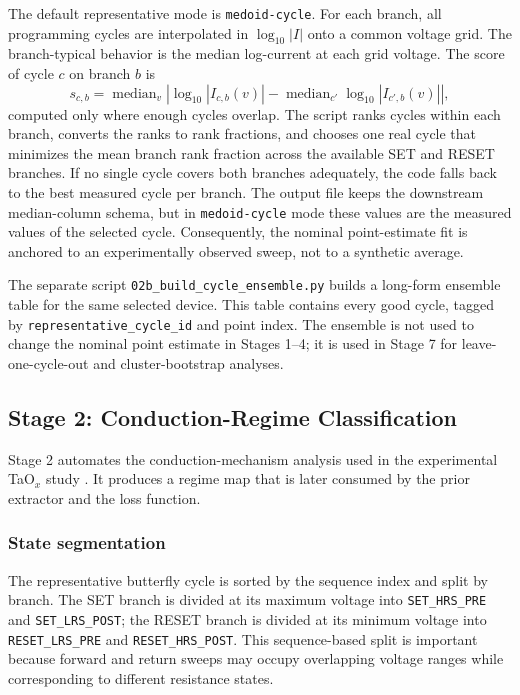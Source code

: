 \documentclass[journal]{IEEEtran}
\begin{document}
The default representative mode is \texttt{medoid-cycle}.  For each branch, all
programming cycles are interpolated in $\log_{10}|I|$ onto a common voltage
grid.  The branch-typical behavior is the median log-current at each grid
voltage.  The score of cycle $c$ on branch $b$ is
\begin{equation}
  s_{c,b} =
  \operatorname{median}_{v}\left|
  \log_{10}|I_{c,b}(v)| -
  \operatorname{median}_{c'}\log_{10}|I_{c',b}(v)|
  \right|,
  \label{eq:medoid-score}
\end{equation}
computed only where enough cycles overlap.  The script ranks cycles within
each branch, converts the ranks to rank fractions, and chooses one real cycle
that minimizes the mean branch rank fraction across the available SET and
RESET branches.  If no single cycle covers both branches adequately, the code
falls back to the best measured cycle per branch.  The output file keeps the
downstream median-column schema, but in \texttt{medoid-cycle} mode these
values are the measured values of the selected cycle.  Consequently, the
nominal point-estimate fit is anchored to an experimentally observed sweep,
not to a synthetic average.

The separate script \texttt{02b\_build\_cycle\_ensemble.py} builds a long-form
ensemble table for the same selected device.  This table contains every good
cycle, tagged by \texttt{representative\_cycle\_id} and point index.  The
ensemble is not used to change the nominal point estimate in Stages 1--4; it
is used in Stage 7 for leave-one-cycle-out and cluster-bootstrap analyses.

\subsection{Stage 2: Conduction-Regime Classification}
\label{sec:regimes}

Stage 2 automates the conduction-mechanism analysis used in the experimental
TaO$_x$ study
\cite{chowdhury2025mwscas}.  It produces a regime map that is later consumed
by the prior extractor and the loss function.

\subsubsection{State segmentation}
The representative butterfly cycle is sorted by the sequence index and split
by branch.  The SET branch is divided at its maximum voltage into
\texttt{SET\_HRS\_PRE} and \texttt{SET\_LRS\_POST}; the RESET branch is divided
at its minimum voltage into \texttt{RESET\_LRS\_PRE} and
\texttt{RESET\_HRS\_POST}.  This sequence-based split is important because
forward and return sweeps may occupy overlapping voltage ranges while
corresponding to different resistance states.
\end{document}
